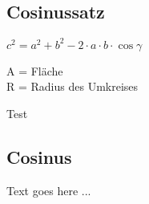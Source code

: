 \begin{sectionbox}
	\subsection{Cosinussatz}
		\begin{emphbox}
			$ c^2 = a^2 + b^2 - 2 \cdot a \cdot b \cdot \cos \gamma $
		\end{emphbox}

\begin{symbolbox}
	A = Fläche\\
	R = Radius des Umkreises
\end{symbolbox}

\begin{bluebox}
	Test
\end{bluebox}


\end{sectionbox}


\begin{sectionbox}
	\subsection{Cosinus}

	Text goes here ...


\end{sectionbox}


